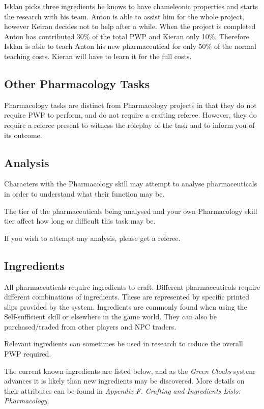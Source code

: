 \documentclass{scrbook}
\begin{document}
Isklan picks three ingredients he knows to have chameleonic properties and starts the research with his team. Anton is able to assist him for the whole project, however Keiran decides not to help after a while. When the project is completed Anton has contributed 30\% of the total PWP and Kieran only 10\%. Therefore Isklan is able to teach Anton his new pharmaceutical for only 50\% of the normal teaching costs. Kieran will have to learn it for the full costs.

\subsection{Other Pharmacology Tasks}

Pharmacology tasks are distinct from Pharmacology projects in that they do not require PWP to perform, and do not require a crafting referee. However, they do require a referee present to witness the roleplay of the task and to inform you of its outcome.

\subsection{Analysis}

Characters with the Pharmacology skill may attempt to analyse pharmaceuticals in order to understand what their function may be.

The tier of the pharmaceuticals being analysed and your own Pharmacology skill tier affect how long or difficult this task may be.

If you wish to attempt any analysis, please get a referee.

\subsection{Ingredients}

All pharmaceuticals require ingredients to craft. Different pharmaceuticals require different combinations of ingredients. These are represented by specific printed slips provided by the system. Ingredients are commonly found when using the Self-sufficient skill or elsewhere in the game world. They can also be purchased/traded from other players and NPC traders.

Relevant ingredients can sometimes be used in research to reduce the overall PWP required.

The current known ingredients are listed below, and as the \textit{Green Cloaks} system advances it is likely than new ingredients may be discovered. More details on their attributes can be found in \textit{Appendix F. Crafting} \textit{and Ingredients Lists: Pharmacology}\textit{.}
\end{document}
